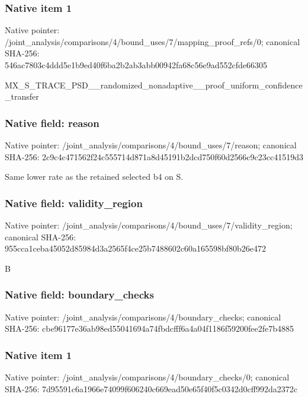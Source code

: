 \documentclass[10pt,a4paper]{article}
\begin{document}
\subsubsection{Native item 1}
Native pointer: /joint\_\allowbreak{}analysis/comparisons/4/bound\_\allowbreak{}uses/7/mapping\_\allowbreak{}proof\_\allowbreak{}refs/0; canonical SHA-256: 546ac7803c4ddd5e1b9ed40f6ba2b2ab3abb00942fa68c56e9ad552cfde66305

\begingroup\raggedright\sloppy MX\_\allowbreak{}S\_\allowbreak{}TRACE\_\allowbreak{}PSD\_\allowbreak{}\_\allowbreak{}randomized\_\allowbreak{}nonadaptive\_\allowbreak{}\_\allowbreak{}proof\_\allowbreak{}uniform\_\allowbreak{}confidence\_\allowbreak{}transfer\par\endgroup

\subsubsection{Native field: reason}
Native pointer: /joint\_\allowbreak{}analysis/comparisons/4/bound\_\allowbreak{}uses/7/reason; canonical SHA-256: 2c9c4c471562f24c555714d871a8d45191b2dcd750f60d2566c9c23cc41519d3

\begingroup\raggedright\sloppy Same lower rate as the retained selected b4 on S.\par\endgroup

\subsubsection{Native field: validity\_\allowbreak{}region}
Native pointer: /joint\_\allowbreak{}analysis/comparisons/4/bound\_\allowbreak{}uses/7/validity\_\allowbreak{}region; canonical SHA-256: 955cca1ceba45052d85984d3a2565f4ce25b7488602c60a165598bf80b26e472

\begingroup\raggedright\sloppy B\par\endgroup

\subsubsection{Native field: boundary\_\allowbreak{}checks}
Native pointer: /joint\_\allowbreak{}analysis/comparisons/4/boundary\_\allowbreak{}checks; canonical SHA-256: cbe96177e36ab98ed55041694a74fbdcfff6a4a04f1186f59200fee2fe7b4885

\subsubsection{Native item 1}
Native pointer: /joint\_\allowbreak{}analysis/comparisons/4/boundary\_\allowbreak{}checks/0; canonical SHA-256: 7d95591c6a1966e74099f606240c669ead50e65f40f5c0342d0cff992da2372c
\end{document}
